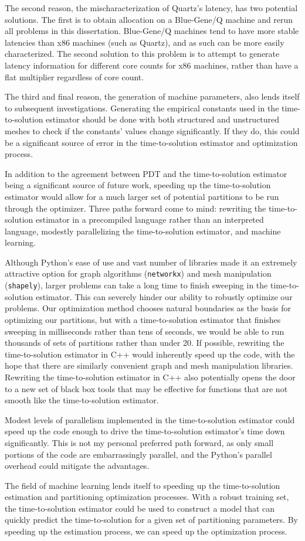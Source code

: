 The second reason, the mischaracterization of Quartz's latency, has two potential solutions.
The first is to obtain allocation on a Blue-Gene/Q machine and rerun all problems in this dissertation.
Blue-Gene/Q machines tend to have more stable latencies than x86 machines (such as Quartz), and as such can be more easily characterized.
The second solution to this problem is to attempt to generate latency information for different core counts for x86 machines, rather than have a flat multiplier regardless of core count.

The third and final reason, the generation of machine parameters, also lends itself to subsequent investigations.
Generating the empirical constants used in the time-to-solution estimator should be done with both structured and unstructured meshes to check if the constants' values change significantly.
If they do, this could be a significant source of error in the time-to-solution estimator and optimization process.

In addition to the agreement between PDT and the time-to-solution estimator being a significant source of future work, speeding up the time-to-solution estimator would allow for a much larger set of potential partitions to be run through the optimizer.
Three paths forward come to mind: rewriting the time-to-solution estimator in a precompiled language rather than an interpreted language, modestly parallelizing the time-to-solution estimator, and machine learning.

Although Python's ease of use and vast number of libraries made it an extremely attractive option for graph algorithms ({\tt networkx}) and mesh manipulation ({\tt shapely}), larger problems can take a long time to finish sweeping in the time-to-solution estimator.
This can severely hinder our ability to robustly optimize our problems.
Our optimization method chooses natural boundaries as the basis for optimizing our partitions, but with a time-to-solution estimator that finishes sweeping in milliseconds rather than tens of seconds, we would be able to run thousands of sets of partitions rather than under 20.
If possible, rewriting the time-to-solution estimator in C++ would inherently speed up the code, with the hope that there are similarly convenient graph and mesh manipulation libraries.
Rewriting the time-to-solution estimator in C++ also potentially opens the door to a new set of black box tools that may be effective for functions that are not smooth like the time-to-solution estimator.

Modest levels of parallelism implemented in the time-to-solution estimator could speed up the code enough to drive the time-to-solution estimator's time down significantly.
This is not my personal preferred path forward, as only small portions of the code are embarrassingly parallel, and the Python's parallel overhead could mitigate the advantages.

The field of machine learning lends itself to speeding up the time-to-solution estimation and partitioning optimization processes.
With a robust training set, the time-to-solution estimator could be used to construct a model that can quickly predict the time-to-solution for a given set of partitioning parameters.
By speeding up the estimation process, we can speed up the optimization process. 
